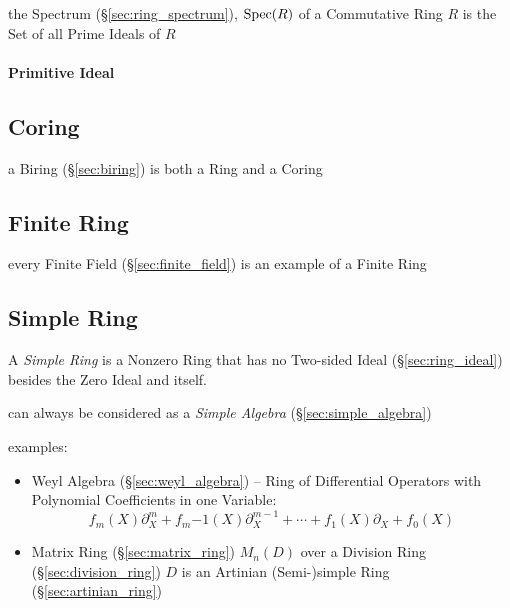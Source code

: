 the Spectrum (\S\ref{sec:ring_spectrum}), $\mathrm{Spec}(R)$ of a Commutative Ring $R$
is the Set of all Prime Ideals of $R$



\paragraph{Primitive Ideal}\label{sec:primitive_ideal}\hfill



\subsection{Coring}\label{sec:coring}

a Biring (\S\ref{sec:biring}) is both a Ring and a Coring



\subsection{Finite Ring}\label{sec:finite_ring}

every Finite Field (\S\ref{sec:finite_field}) is an example of a Finite Ring



\subsection{Simple Ring}\label{sec:simple_ring}

A \emph{Simple Ring} is a Nonzero Ring that has no Two-sided Ideal
(\S\ref{sec:ring_ideal}) besides the Zero Ideal and itself.

can always be considered as a \emph{Simple Algebra} (\S\ref{sec:simple_algebra})

examples:
\begin{itemize}
  \item Weyl Algebra (\S\ref{sec:weyl_algebra}) -- Ring of Differential
    Operators with Polynomial Coefficients in one Variable:\[
      f_m(X)\partial^m_X + f_m{-1}(X)\partial^{m-1}_X + \cdots +
      f_1(X)\partial_X + f_0(X)
    \]
  \item Matrix Ring (\S\ref{sec:matrix_ring}) $M_n(D)$ over a Division Ring
    (\S\ref{sec:division_ring}) $D$ is an Artinian (Semi-)simple Ring
    (\S\ref{sec:artinian_ring})
\end{itemize}



